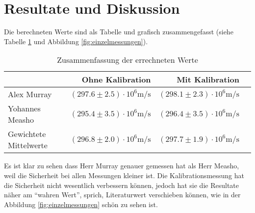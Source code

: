 \section{Resultate und Diskussion}

Die berechneten Werte sind  als  Tabelle  und  grafisch  zusammengefasst  (siehe
Tabelle \ref{tab:zusammenfassung} und  Abbildung \ref{fig:einzelmessungen}).

\begin{table}[ht!]
    \begin{center}
        \caption{Zusammenfassung der errechneten Werte}
        \label{tab:zusammenfassung}
        \begin{tabular}{lrrr}
            \toprule
                                    & Ohne Kalibration                                  & Mit Kalibration                                   \\
            \midrule
            Alex Murray             & $(297.6 \pm 2.5)\cdot 10^6\textrm{m}/\textrm{s}$  & $(298.1 \pm 2.3)\cdot 10^6\textrm{m}/\textrm{s}$  \\
            Yohannes Measho         & $(295.4 \pm 3.5)\cdot 10^6\textrm{m}/\textrm{s}$  & $(296.4 \pm 3.5)\cdot 10^6\textrm{m}/\textrm{s}$  \\
            \midrule
            Gewichtete Mittelwerte  & $(296.8 \pm 2.0)\cdot 10^6\textrm{m}/\textrm{s}$  & $(297.7 \pm 1.9)\cdot 10^6\textrm{m}/\textrm{s}$  \\
            \bottomrule
        \end{tabular}
    \end{center}
\end{table}

Es ist klar zu sehen dass Herr Murray genauer gemessen hat als Herr Measho, weil
die Sicherheit bei allen  Messungen kleiner ist. Die Kalibrationsmessung hat die
Sicherheit  nicht wesentlich verbessern k\"onnen, jedoch hat sie  die  Resultate
n\"aher am ``wahren Wert'', sprich, Literaturwert verschieben  k\"onnen,  wie in
der Abbildung \ref{fig:einzelmessungen} sch\"on zu sehen ist.

